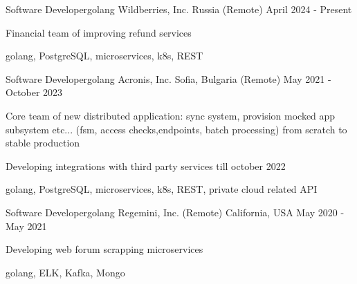 

\begin{cventries}

 \cventry
    {Software Developer{\enskip\cdotp\enskip}golang} %
    {Wildberries, Inc.} %
    {Russia (Remote)} %
    {April 2024 - Present} %
    {
      \begin{cvitems} %
        \item {Financial team of improving refund services }
        \item {golang, PostgreSQL, microservices, k8s, REST}
      \end{cvitems}
    }

  \cventry
    {Software Developer{\enskip\cdotp\enskip}golang} %
    {Acronis, Inc.} %
    {Sofia, Bulgaria (Remote)} %
    {May 2021 - October 2023} %
    {
      \begin{cvitems} %
        \item {Core team of new distributed application: sync system, provision mocked app subsystem etc... (fsm, access checks,endpoints, batch processing) from scratch to stable production}
        \item {Developing integrations with third party services till october 2022}
        \item {golang, PostgreSQL, microservices, k8s, REST, private cloud related API}
      \end{cvitems}
    }
    
  \cventry
    {Software Developer{\enskip\cdotp\enskip}golang} %
    {Regemini, Inc. (Remote)} %
    {California, USA} %
    {May 2020 - May 2021} %
    {
      \begin{cvitems} %
        \item {Developing web forum scrapping microservices}
        \item {golang, ELK, Kafka, Mongo}
      \end{cvitems}
    }


\end{cventries}
